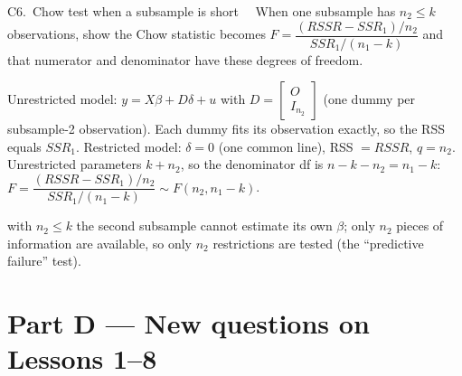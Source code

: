 \begin{qbox}{C6.\ Chow test when a subsample is short}{\must\ \ }
When one subsample has $n_{2}\le k$ observations, show the Chow statistic becomes
$F=\dfrac{(RSSR-SSR_{1})/n_{2}}{SSR_{1}/(n_{1}-k)}$ and that numerator and denominator have these degrees of freedom.
\end{qbox}
\begin{solbox}
 Unrestricted model: $y=X\beta+D\delta+u$ with $D=\begin{bmatrix}O\\I_{n_{2}}\end{bmatrix}$ (one dummy per
subsample-2 observation). Each dummy fits its observation exactly, so the RSS equals $SSR_{1}$.
 Restricted model: $\delta=0$ (one common line), RSS $=RSSR$, $q=n_{2}$. Unrestricted parameters $k+n_{2}$, so the
denominator df is $n-k-n_{2}=n_{1}-k$:
$F=\dfrac{(RSSR-SSR_{1})/n_{2}}{SSR_{1}/(n_{1}-k)}\sim F(n_{2},n_{1}-k)$.
\begin{why}\Why with $n_{2}\le k$ the second subsample cannot estimate its own $\beta$; only $n_{2}$ pieces of information are
available, so only $n_{2}$ restrictions are tested (the ``predictive failure'' test).\end{why}
\end{solbox}

\section{Part D --- New questions on Lessons 1--8}

